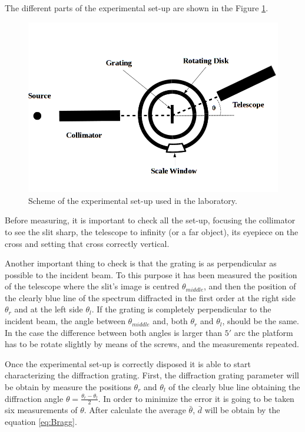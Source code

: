 \documentclass[twoside]{article}
\newcommand{\cl}{clearly blue }
\begin{document}
\begin{multicols}{2}
			The different parts of the experimental set-up are shown in the Figure \ref{Img:GnoSqueme}.

				\begin{figure}[H]
					\centering
					\includegraphics[scale=0.24]{GnoSqueme.png}
					\caption{\label{Img:GnoSqueme}Scheme of the experimental set-up used in the laboratory.}
				\end{figure}

			Before measuring, it is important to check all the set-up, focusing the collimator to see the slit sharp, the telescope to infinity (or a far object), its eyepiece on the cross and setting that cross correctly vertical.

			Another important thing to check is that the grating is as perpendicular as possible to the incident beam. To this purpose it has been measured the position of the telescope where the slit's image is centred $\theta_{middle}$, and then the position of the \cl line of the spectrum diffracted in the first order at the right side $\theta_r$ and at the left side $\theta_l$. If the grating is completely perpendicular to the incident beam, the angle between $\theta_{middle}$ and, both $\theta_r$ and $\theta_l$, should be the same. In the case the difference between both angles is larger than $5'$ arc the platform has to be rotate  slightly by means of the screws, and the measurements repeated.

			Once the experimental set-up is correctly disposed it is able to start characterizing the diffraction grating. First, the diffraction grating parameter will be obtain by measure the positions $\theta_r$ and $\theta_l$ of the \cl line obtaining the diffraction angle $\theta = \frac{\theta_r-\theta_l}{2}$. In order to minimize the error it is going to be taken six measurements of $\theta$. After calculate the average $\bar{\theta}$, $\bar{d}$ will be obtain by the equation \ref{eq:Bragg}.


\end{multicols}
\end{document}
